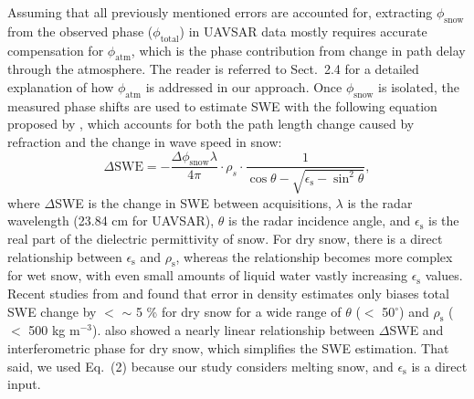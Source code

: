 Assuming that all previously mentioned errors are accounted for, extracting $\phi_\mathrm{snow}$ from the observed phase ($\phi_\mathrm{total}$) in UAVSAR data mostly requires accurate compensation for $\phi_\mathrm{atm}$, which is the phase contribution from change in path delay through the atmosphere. The reader is referred to Sect.~2.4 for a detailed explanation of how $\phi_{\mathrm{atm}}$ is addressed in our approach. Once $\phi_\mathrm{snow}$ is isolated, the measured phase shifts are used to estimate SWE with the following equation proposed by \citet{guneriussenInSAREstimationChanges2001}, which accounts for both the path length change caused by refraction and the change in wave speed in snow:
\begin{equation}
\Delta\text{SWE} = - \frac{\Delta \phi_\mathrm{snow} \lambda}{4 \pi} \cdot \rho_{s} \cdot \frac{1}{\cos \theta- \sqrt{\epsilon_\mathrm{s} - \sin^{2} \theta}},
\end{equation}
where $\Delta$SWE is the change in SWE between acquisitions, $\lambda$ is the radar wavelength (23.84 cm for UAVSAR), $\theta$ is the radar incidence angle, and $\epsilon_\mathrm{s}$ is the real part of the dielectric permittivity of snow. For dry snow, there is a direct relationship between $\epsilon_\mathrm{s}$ and $\rho_\mathrm{s}$, whereas the relationship becomes more complex for wet snow, with even small amounts of liquid water vastly increasing $\epsilon_\mathrm{s}$ values. Recent studies from \citet{epplerSnowWaterEquivalent2022} and \citet{leinssSnowWaterEquivalent2015} found that error in density estimates only biases total SWE change by $<$ $\sim$ 5 \% for dry snow for a wide range of $\theta$ ($<$ 50$^{\circ}$) and $\rho_\mathrm{s}$ ($<$ 500 kg m$^{-3}$). \citet{leinssSnowWaterEquivalent2015} also showed a nearly linear relationship between $\Delta$SWE and interferometric phase for dry snow, which simplifies the SWE estimation. That said, we used Eq.~(2) because our study considers melting snow, and $\epsilon_\mathrm{s}$ is a direct input. \par

